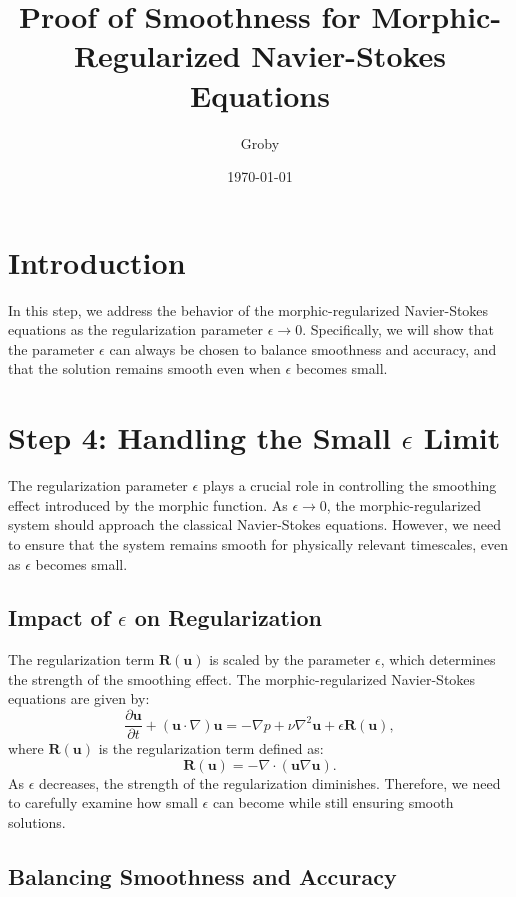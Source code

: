 \documentclass{article}
\title{Proof of Smoothness for Morphic-Regularized Navier-Stokes Equations}
\author{Groby}
\date{\today}
\begin{document}
\maketitle

\section*{Introduction}

In this step, we address the behavior of the morphic-regularized Navier-Stokes equations as the regularization parameter \( \epsilon \to 0 \). Specifically, we will show that the parameter \( \epsilon \) can always be chosen to balance smoothness and accuracy, and that the solution remains smooth even when \( \epsilon \) becomes small.

\section{Step 4: Handling the Small \( \epsilon \) Limit}

The regularization parameter \( \epsilon \) plays a crucial role in controlling the smoothing effect introduced by the morphic function. As \( \epsilon \to 0 \), the morphic-regularized system should approach the classical Navier-Stokes equations. However, we need to ensure that the system remains smooth for physically relevant timescales, even as \( \epsilon \) becomes small.

\subsection*{Impact of \( \epsilon \) on Regularization}

The regularization term \( \mathbf{R}(\mathbf{u}) \) is scaled by the parameter \( \epsilon \), which determines the strength of the smoothing effect. The morphic-regularized Navier-Stokes equations are given by:
\[
\frac{\partial \mathbf{u}}{\partial t} + (\mathbf{u} \cdot \nabla) \mathbf{u} = -\nabla p + \nu \nabla^2 \mathbf{u} + \epsilon \mathbf{R}(\mathbf{u}),
\]
where \( \mathbf{R}(\mathbf{u}) \) is the regularization term defined as:
\[
\mathbf{R}(\mathbf{u}) = -\nabla \cdot (\mathbf{u} \nabla \mathbf{u}).
\]
As \( \epsilon \) decreases, the strength of the regularization diminishes. Therefore, we need to carefully examine how small \( \epsilon \) can become while still ensuring smooth solutions.

\subsection*{Balancing Smoothness and Accuracy}
\end{document}
